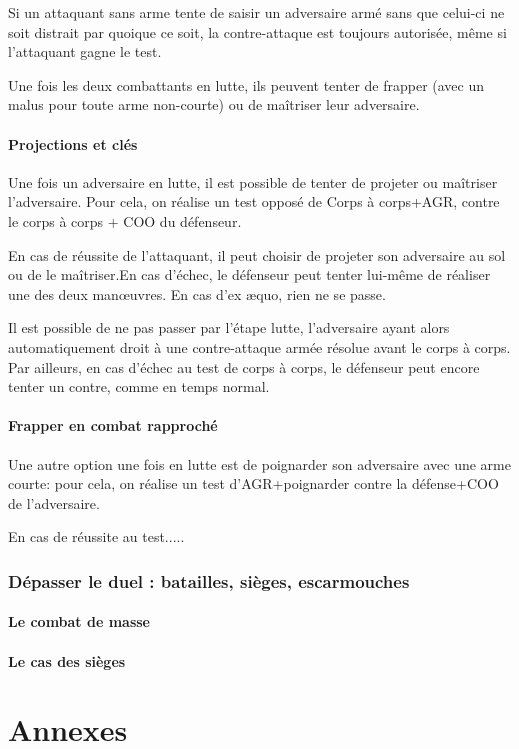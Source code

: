\documentclass[10pt,a4paper,twocolumn]{book}
\begin{document}
Si un attaquant sans arme tente de saisir un adversaire armé sans que celui-ci ne soit distrait par quoique ce soit, la contre-attaque est toujours autorisée, même si l'attaquant gagne le test.

Une fois les deux combattants en lutte, ils peuvent tenter de frapper (avec un malus pour toute arme non-courte) ou de maîtriser leur adversaire.
\subsection{Projections et clés}
Une fois un adversaire en lutte, il est possible de tenter de projeter ou maîtriser l'adversaire. Pour cela, on réalise un test opposé de Corps à corps+AGR, contre le corps à corps + COO du défenseur.

En cas de réussite de l'attaquant, il peut choisir de projeter son adversaire au sol ou de le maîtriser.En cas d'échec, le défenseur peut tenter lui-même de réaliser une des deux manœuvres. En cas d'ex æquo, rien ne se passe.

Il est possible de ne pas passer par l'étape lutte, l'adversaire ayant alors automatiquement droit à une contre-attaque armée résolue avant le corps à corps. Par ailleurs, en cas d'échec au test de corps à corps, le défenseur peut encore tenter un contre, comme en temps normal.
\subsection{Frapper en combat rapproché}
Une autre option une fois en lutte est de poignarder son adversaire avec une arme courte: pour cela, on réalise un test d'AGR+poignarder contre la défense+COO de l'adversaire.

En cas de réussite au test.....
\section{Dépasser le duel : batailles, sièges, escarmouches}
\subsection{Le combat de masse}
\subsection{Le cas des sièges}


\part*{Annexes}
\end{document}
